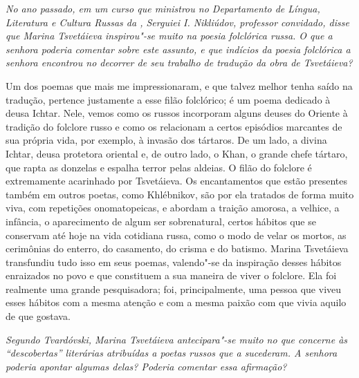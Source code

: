 \medskip

\emph{No ano passado, em um curso que ministrou no
Departamento de Língua, Literatura e Cultura Russas da , Serguiei I.
Nikliúdov, professor convidado, disse que Marina Tsvetáieva inspirou"-se
muito na poesia folclórica russa. O que a senhora poderia comentar sobre
este assunto, e que indícios da poesia folclórica a senhora encontrou no
decorrer de seu trabalho de tradução da obra de Tsvetáieva?}

Um dos poemas que mais me impressionaram, e que talvez
melhor tenha saído na tradução, pertence justamente a esse filão
folclórico; é um poema dedicado à deusa Ichtar. Nele, vemos como os
russos incorporam alguns deuses do Oriente à tradição do folclore russo
e como os relacionam a certos episódios marcantes de sua própria vida,
por exemplo, à invasão dos tártaros. De um lado, a divina Ichtar, deusa
protetora oriental e, de outro lado, o Khan, o grande chefe tártaro, que
rapta as donzelas e espalha terror pelas aldeias. O filão do folclore é
extremamente acarinhado por Tsvetáieva. Os encantamentos que estão
presentes também em outros poetas, como Khlébnikov, são por ela tratados
de forma muito viva, com repetições onomatopeicas, e abordam a traição
amorosa, a velhice, a infância, o aparecimento de algum ser
sobrenatural, certos hábitos que se conservam até hoje na vida cotidiana
russa, como o modo de velar os mortos, as cerimônias do enterro, do
casamento, do crisma e do batismo. Marina Tsvetáieva transfundiu tudo
isso em seus poemas, valendo"-se da inspiração desses hábitos enraizados
no povo e que constituem a sua maneira de viver o folclore. Ela foi
realmente uma grande pesquisadora; foi, principalmente, uma pessoa que
viveu esses hábitos com a mesma atenção e com a mesma paixão com que
vivia aquilo de que gostava.

\medskip

\emph{Segundo Tvardóvski, Marina Tsvetáieva antecipara"-se
muito no que concerne às ``descobertas'' literárias atribuídas a poetas
russos que a sucederam. A senhora poderia apontar algumas delas?
Poderia comentar essa afirmação?}

